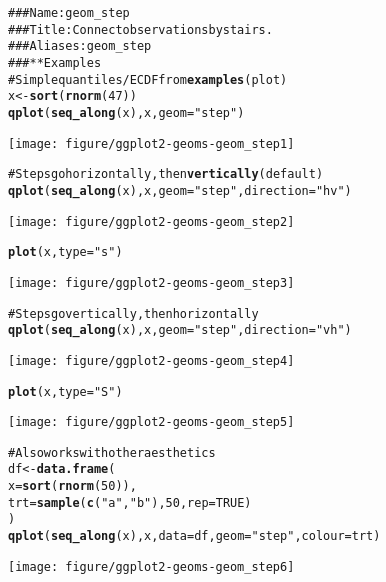 \documentclass[a4paper,titlepage]{tufte-handout}\usepackage{graphicx, color}
\makeatletter
\def\maxwidth{ %
  \ifdim\Gin@nat@width>\linewidth
    \linewidth
  \else
    \Gin@nat@width
  \fi
}
\newcommand{\hlfunctioncall}[1]{\textcolor[rgb]{0.501960784313725,0,0.329411764705882}{\textbf{#1}}}%
\newcommand{\hlstring}[1]{\textcolor[rgb]{0.6,0.6,1}{#1}}%
\newcommand{\hlcomment}[1]{\textcolor[rgb]{0.180392156862745,0.6,0.341176470588235}{#1}}%
\newenvironment{kframe}{%
 \def\at@end@of@kframe{}%
 \ifinner\ifhmode%
  \def\at@end@of@kframe{\end{minipage}}%
  \begin{minipage}{\columnwidth}%
 \fi\fi%
 \def\FrameCommand##1{\hskip\@totalleftmargin \hskip-\fboxsep
 \colorbox{shadecolor}{##1}\hskip-\fboxsep
     \hskip-\linewidth \hskip-\@totalleftmargin \hskip\columnwidth}%
 \MakeFramed {\advance\hsize-\width
   \@totalleftmargin\z@ \linewidth\hsize
   \@setminipage}}%
 {\par\unskip\endMakeFramed%
 \at@end@of@kframe}
\newenvironment{knitrout}{}{} %
\makeatother
\begin{document}
\begin{knitrout}
\color{fgcolor}\begin{kframe}
\begin{alltt}
\hlcomment{### Name: geom_step}
\hlcomment{### Title: Connect observations by stairs.}
\hlcomment{### Aliases: geom_step}
\hlcomment{### ** Examples}
\hlcomment{# Simple quantiles/ECDF from \hlfunctioncall{examples}(plot)}
x <- \hlfunctioncall{sort}(\hlfunctioncall{rnorm}(47))
\hlfunctioncall{qplot}(\hlfunctioncall{seq_along}(x), x, geom=\hlstring{"step"})
\end{alltt}
\end{kframe}\texttt{[image: figure/ggplot2-geoms-geom\_step1]} \begin{kframe}\begin{alltt}
\hlcomment{# Steps go horizontally, then \hlfunctioncall{vertically} (default)}
\hlfunctioncall{qplot}(\hlfunctioncall{seq_along}(x), x, geom=\hlstring{"step"}, direction = \hlstring{"hv"})
\end{alltt}
\end{kframe}\texttt{[image: figure/ggplot2-geoms-geom\_step2]} \begin{kframe}\begin{alltt}
\hlfunctioncall{plot}(x, type = \hlstring{"s"})
\end{alltt}
\end{kframe}\texttt{[image: figure/ggplot2-geoms-geom\_step3]} \begin{kframe}\begin{alltt}
\hlcomment{# Steps go vertically, then horizontally}
\hlfunctioncall{qplot}(\hlfunctioncall{seq_along}(x), x, geom=\hlstring{"step"}, direction = \hlstring{"vh"})
\end{alltt}
\end{kframe}\texttt{[image: figure/ggplot2-geoms-geom\_step4]} \begin{kframe}\begin{alltt}
\hlfunctioncall{plot}(x, type = \hlstring{"S"})
\end{alltt}
\end{kframe}\texttt{[image: figure/ggplot2-geoms-geom\_step5]} \begin{kframe}\begin{alltt}
\hlcomment{# Also works with other aesthetics}
df <- \hlfunctioncall{data.frame}(
  x = \hlfunctioncall{sort}(\hlfunctioncall{rnorm}(50)),
  trt = \hlfunctioncall{sample}(\hlfunctioncall{c}(\hlstring{"a"}, \hlstring{"b"}), 50, rep = TRUE)
)
\hlfunctioncall{qplot}(\hlfunctioncall{seq_along}(x), x, data = df, geom=\hlstring{"step"}, colour = trt)
\end{alltt}
\end{kframe}\texttt{[image: figure/ggplot2-geoms-geom\_step6]} 
\end{knitrout}
\end{document}

